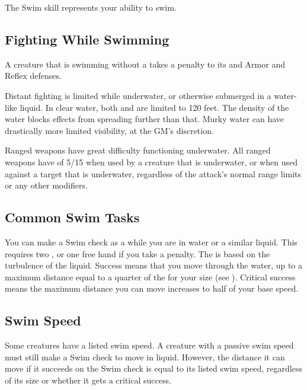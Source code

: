 \newpage
{}
        The Swim skill represents your ability to swim.

    \subsection{Fighting While Swimming}
        A creature that is swimming without a  takes a  penalty to its  and Armor and Reflex defenses.

        Distant fighting is limited while underwater, or otherwise submerged in a water-like liquid.
        In clear water, both  and  are limited to 120 feet.
        The density of the water blocks effects from spreading further than that.
        Murky water can have drastically more limited visibility, at the GM's discretion.

        Ranged weapons have great difficulty functioning underwater.
        All ranged weapons have  of 5/15 when used by a creature that is underwater, or when used against a target that is underwater, regardless of the attack's normal range limits or any other modifiers.

    \subsection{Common Swim Tasks}
         You can make a Swim check as a  while you are in water or a similar liquid.
        This requires two , or one free hand if you take a  penalty.
        The  is based on the turbulence of the liquid.
        Success means that you move through the water, up to a maximum distance equal to a quarter of the  for your size (see ).
        Critical success means the maximum distance you can move increases to half of your base speed.

    \subsection{Swim Speed}\label{Swim Speed}
        Some creatures have a listed swim speed.
        A creature with a passive swim speed must still make a Swim check to move in liquid.
        However, the distance it can move if it succeeds on the Swim check is equal to its listed swim speed, regardless of its size or whether it gets a critical success.
